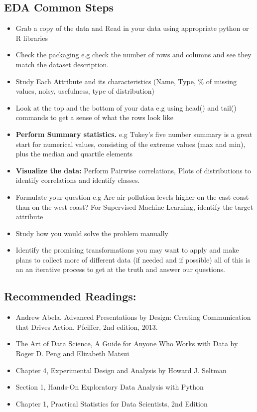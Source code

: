 \documentclass[openany]{book}
\begin{document}
\subsection{EDA Common Steps}

\begin{itemize}
    \item Grab a copy of the data and Read in your data using appropriate python or R libraries 
    \item Check the packaging e.g check the number of rows and columns and see they match the dataset description.
    \item Study Each Attribute and its characteristics (Name, Type, \% of missing values, noisy, usefulness, type of distribution)
    \item Look at the top and the bottom of your data e.g using head() and tail() commands to get a sense of what the rows look like
    \item \textbf{Perform Summary statistics.} e.g Tukey’s five number summary is a great start for numerical values, consisting of the extreme values (max and min), plus the median and quartile elements
    \item \textbf{Visualize the data:} Perform Pairwise correlations, Plots of distributions to identify correlations and identify
    classes.
    \item Formulate your question e.g Are air pollution levels higher on the east coast than on the west coast? For Supervised Machine Learning, identify the target attribute
    \item Study how you would solve the problem manually
    \item Identify the promising transformations you may want to apply and make plans to collect more of different data (if needed and if possible) all of this is an an iterative process to get at the truth and answer our questions.

\end{itemize}
    

\subsection{Recommended Readings:}

\begin{itemize}
    \item Andrew Abela. Advanced Presentations by Design: Creating Communication that Drives Action. Pfeiffer, 2nd edition, 2013.
    \item The Art of Data Science, A Guide for Anyone Who Works with Data by Roger D. Peng and Elizabeth Matsui
    \item Chapter 4, Experimental Design and Analysis by Howard J. Seltman
    \item Section 1, Hands-On Exploratory Data Analysis with Python
    \item Chapter 1, Practical Statistics for Data Scientists, 2nd Edition


\end{itemize}
\end{document}
